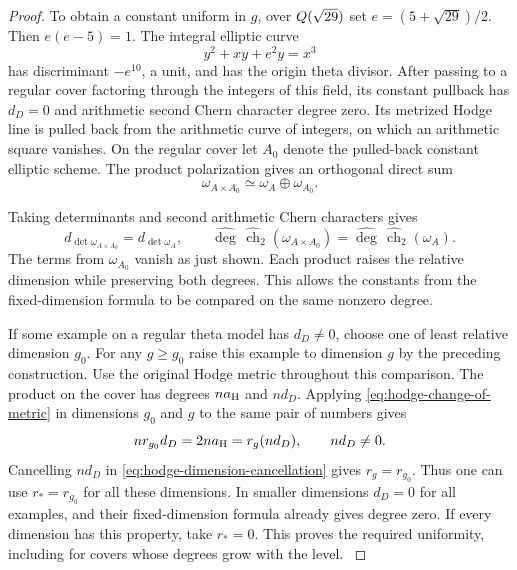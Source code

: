 \begin{proof}
To obtain a constant uniform in \(g\), over
\(Q(\sqrt{29})\) set \(e=(5+\sqrt{29})/2\). Then \(e(e-5)=1\).
The integral elliptic curve
\[
 y^2+xy+e^2y=x^3
\]
has
discriminant \(-e^{10}\), a unit, and has the origin theta
divisor. After passing to a regular cover factoring through the
integers of this field, its constant pullback has \(d_D=0\)
and arithmetic second Chern character degree zero. Its
metrized Hodge line is pulled back from the arithmetic curve
of integers, on which an arithmetic square vanishes.
On the regular cover let \(A_0\) denote the pulled-back
constant elliptic scheme. The product polarization gives an
orthogonal direct sum
\[
 \omega_{A\times A_0}\simeq\omega_A\oplus\omega_{A_0}.
\]

Taking determinants and second arithmetic Chern characters gives
\[
 d_{\det\omega_{A\times A_0}}=d_{\det\omega_A},\qquad
 \widehat{\deg}\,\widehat{\operatorname{ch}}_2(\omega_{A\times A_0})
       =\widehat{\deg}\,\widehat{\operatorname{ch}}_2(\omega_A).
\]
The terms from \(\omega_{A_0}\) vanish as just shown.
Each product raises the relative dimension while preserving both degrees. This allows the constants from the fixed-dimension formula to be compared on the same nonzero degree.

If some example on a regular theta model has \(d_D\ne0\),
choose one of least relative dimension \(g_0\). For any
\(g\ge g_0\) raise this example to dimension \(g\) by the
preceding construction. Use the original Hodge metric throughout this comparison.
The product on the cover has degrees \(n a_{\rm H}\) and \(n d_D\).
Applying \eqref{eq:hodge-change-of-metric} in dimensions \(g_0\) and \(g\)
to the same pair of numbers gives
\begin{equation}\label{eq:hodge-dimension-cancellation}
 n r_{g_0}d_D=2n a_{\rm H}=r_g(n d_D),\qquad n d_D\ne0 .
\end{equation}
Cancelling \(n d_D\) in \eqref{eq:hodge-dimension-cancellation}
gives \(r_g=r_{g_0}\). Thus one can use \(r_*=r_{g_0}\) for all these dimensions. In smaller dimensions
\(d_D=0\) for all examples, and their fixed-dimension formula
already gives degree zero. If every dimension has this
property, take \(r_*=0\). This proves the required uniformity,
including for covers whose degrees grow with the level.
\label{cor:hodge-surface-degree-7}


\end{proof}
